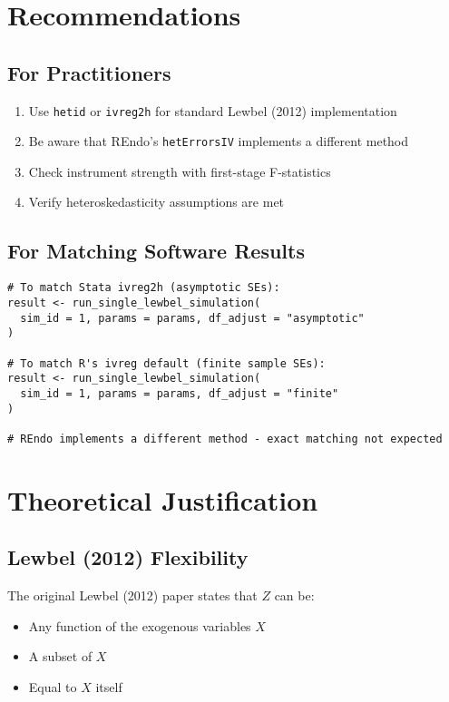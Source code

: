 \documentclass[12pt]{article}
\begin{document}
\section{Recommendations}

\subsection{For Practitioners}

\begin{enumerate}
\item Use \texttt{hetid} or \texttt{ivreg2h} for standard Lewbel (2012) implementation
\item Be aware that REndo's \texttt{hetErrorsIV} implements a different method
\item Check instrument strength with first-stage F-statistics
\item Verify heteroskedasticity assumptions are met
\end{enumerate}

\subsection{For Matching Software Results}

\begin{lstlisting}[caption={Matching different implementations}]
# To match Stata ivreg2h (asymptotic SEs):
result <- run_single_lewbel_simulation(
  sim_id = 1, params = params, df_adjust = "asymptotic"
)

# To match R's ivreg default (finite sample SEs):
result <- run_single_lewbel_simulation(
  sim_id = 1, params = params, df_adjust = "finite"
)

# REndo implements a different method - exact matching not expected
\end{lstlisting}

\section{Theoretical Justification}

\subsection{Lewbel (2012) Flexibility}

The original Lewbel (2012) paper states that $Z$ can be:
\begin{itemize}
\item Any function of the exogenous variables $X$
\item A subset of $X$
\item Equal to $X$ itself
\end{itemize}
\end{document}
